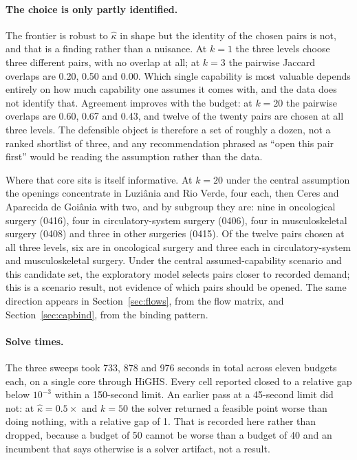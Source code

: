 \paragraph{The choice is only partly identified.} The frontier is robust to
$\hat{\kappa}$ in shape but the identity of the chosen pairs is not, and that is a
finding rather than a nuisance. At $k=1$ the three levels choose three different
pairs, with no overlap at all; at $k=3$ the pairwise Jaccard overlaps are 0.20,
0.50 and 0.00. Which single capability is most valuable depends entirely on how
much capability one assumes it comes with, and the data does not identify that.
Agreement improves with the budget: at $k=20$ the pairwise overlaps are 0.60,
0.67 and 0.43, and twelve of the twenty pairs are chosen at all three levels.
The defensible object is therefore a set of roughly a dozen, not a ranked
shortlist of three, and any recommendation phrased as ``open this pair first''
would be reading the assumption rather than the data.

Where that core sits is itself informative. At $k=20$ under the central
assumption the openings concentrate in Luzi\^ania and Rio Verde, four each, then
Ceres and Aparecida de Goi\^ania with two, and by subgroup they are: nine in oncological surgery (0416), four in circulatory-system surgery (0406), four in musculoskeletal surgery (0408) and three in other surgeries (0415). Of the twelve pairs chosen at all three levels, six are in oncological surgery and three each in circulatory-system and musculoskeletal surgery. Under the central assumed-capability scenario and this candidate set, the exploratory model selects pairs closer to recorded demand; this is a scenario result, not evidence of which pairs should be opened. The same direction appears in Section~\ref{sec:flows}, from the flow matrix, and Section~\ref{sec:capbind}, from the binding pattern.

\paragraph{Solve times.} The three sweeps took 733, 878 and 976 seconds in total
across eleven budgets each, on a single core through HiGHS. Every cell reported
closed to a relative gap below $10^{-3}$ within a 150-second limit. An earlier
pass at a 45-second limit did not: at $\hat{\kappa} = 0.5\times$ and $k = 50$ the
solver returned a feasible point worse than doing nothing, with a relative gap of
1. That is recorded here rather than dropped, because a budget of 50 cannot be
worse than a budget of 40 and an incumbent that says otherwise is a solver
artifact, not a result.


